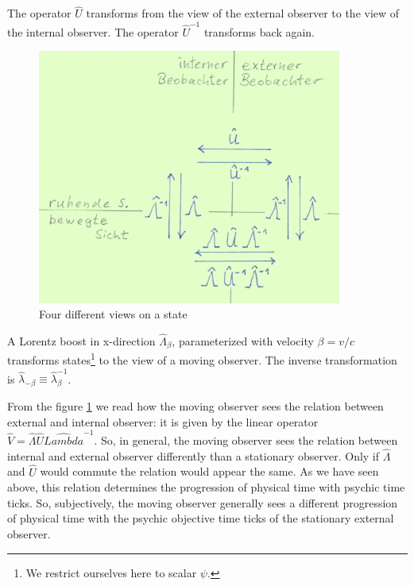 \documentclass[12pt]{article}
\begin{document}
The operator $\hat{U}$ transforms from the view of the external observer to the view of the internal observer. The operator $\hat{U}^{-1}$ transforms back again.
\begin{figure}[!h]\begin{center}
  \includegraphics[width=10cm]{Bewegte_Uhr.png}
  \caption{Four different views on a state}
  \label{fig:moved_clock}
\end{center}\end{figure}

A Lorentz boost in x-direction $\hat{\Lambda}_\beta$, parameterized with velocity $\beta=v/c$ transforms states\footnote{We restrict ourselves here to scalar $\psi$.} to the view of a moving observer. The inverse transformation is $\hat{\lambda}_{-\beta} \equiv \hat{\lambda}_{\beta}^{-1}$.

From the figure \ref{fig:moved_clock} we read how the moving observer sees the relation between external and internal observer: it is given by the linear operator $\hat{V} = \hat{\Lambda} \hat{U} \hat{Lambda}^{-1}$. So, in general, the moving observer sees the relation between internal and external observer differently than a stationary observer. Only if $\hat{\Lambda}$ and $\hat{U}$ would commute the relation would appear the same. As we have seen above, this relation determines the progression of physical time with psychic time ticks. So, subjectively, the moving observer generally sees a different progression of physical time with the psychic objective time ticks of the stationary external observer.
\end{document}
